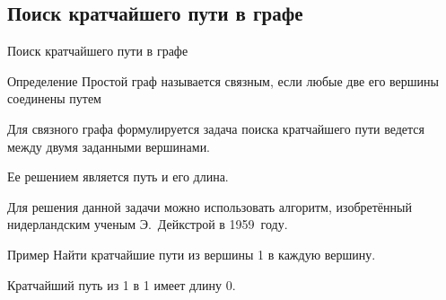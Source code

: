 \documentclass[unicode,11pt,notheorems]{beamer}
\begin{document}
\subsection{Поиск кратчайшего пути в графе}
\begin{frame}{Поиск кратчайшего пути в графе}


\begin{block}{Определение}
		Простой граф называется \alert{связным}, если любые две его вершины соединены путем
\end{block}

Для связного графа формулируется задача поиска кратчайшего пути ведется
между двумя заданными вершинами.

Ее решением является путь и его длина.

Для решения данной задачи можно использовать алгоритм, изобретённый
нидерландским ученым Э.~Дейкстрой в 1959~году.
\end{frame}
\begin{frame}{Пример }{}
Найти кратчайшие пути из вершины 1 в каждую вершину.
{\centering
{}
\par}
Кратчайший путь из 1 в 1 имеет длину 0. 
\end{frame}
\end{document}
